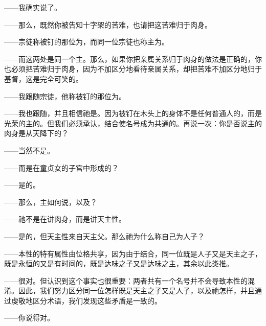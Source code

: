 ——我确实说了。\par

——那么，既然你被告知十字架的苦难，也请把这苦难归于肉身。\par

——宗徒称被钉的那位为，而同一位宗徒也称主为。\par

——而这两处是同一个主。那么，如果你把亲属关系归于肉身的做法是正确的，你也必须把苦难归于肉身，因为不加区分地看待亲属关系，却把苦难不加区分地归于基督，这是完全可笑的。\par

——我跟随宗徒，他称被钉的那位为。\par

——我也跟随，并且相信祂是。因为被钉在木头上的身体不是任何普通人的，而是光荣的主的。但我们必须承认，结合使名号成为共通的。再说一次：你是否说主的肉身是从天降下的？\par

——当然不是。\par

——而是在童贞女的子宫中形成的？\par

——是的。\par

——那么，主如何说，以及？\par

——祂不是在讲肉身，而是讲天主性。\par

——是的，但天主性来自天主父。那么祂为什么称自己为人子？\par

——本性的特有属性由位格共享，因为由于结合，同一位既是人子又是天主之子，既是永恒的又是有时间的，既是达味之子又是达味之主，其余以此类推。\par

——很对。但认识到这个事实也很重要：两者共有一个名号并不会导致本性的混淆。因此，我们努力区分同一位怎样既是天主之子又是人子，以及祂怎样，并且通过虔敬地区分术语，我们发现这些矛盾是一致的。\par

——你说得对。\par

